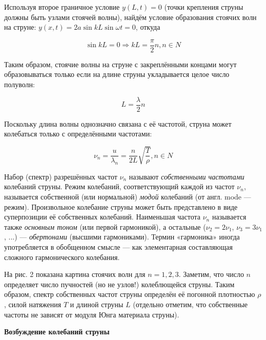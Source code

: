 \documentclass[14pt]{article}
\begin{document}
Используя второе граничное условие $y(L, t) = 0$ (точки крепления струны должны быть узлами стоячей волны), найдём условие образования стоячих
волн на струне: $y(x, t) = 2a\sin kL \sin \omega t = 0$, откуда 

$$\sin kL = 0 \Rightarrow kL = \frac{\pi}{2}n, n \in N$$

Таким образом, стоячие волны на струне с закреплёнными концами могут образовываться только если на длине струны укладывается целое число полуволн:

\begin{center}
\begin{equation}
L = \frac{\lambda}{2}n
\end{equation}
\end{center}

Поскольку длина волны однозначно связана с её частотой, струна может колебаться только с определёнными частотами:

\begin{center}
\begin{equation}
\nu_n = \frac{u}{\lambda_n} = \frac{n}{2L}\sqrt{\frac{T}{\rho}}, n \in N
\end{equation}
\end{center}

Набор (спектр) разрешённых частот $\nu_n$ называют \textsl{собственными частотами} колебаний струны. Режим колебаний, соответствующий каждой из частот $\nu_n$, называется собственной (или нормальной) \textsl{модой} колебаний (от англ. mode --- режим). Произвольное колебание струны может быть представлено в виде суперпозиции её собственных колебаний. Наименьшая частота $\nu_n$ называется также \textsl{основным тоном} (или первой гармоникой), а остальные ($\nu_2 = 2\nu_1$, $\nu_3 = 3\nu_1$, ...) --- \textsl{обертонами} (высшими гармониками). Термин «гармоника» иногда употребляется в обобщенном смысле — как элементарная составляющая сложного гармонического колебания.

На рис. 2 показана картина стоячих волн для $n = 1, 2, 3$. Заметим, что число $n$ определяет число пучностей (но не узлов!) колеблющейся струны. Таким образом, спектр собственных частот струны определён её погонной плотностью $\rho$, силой натяжения $T$ и длиной струны $L$ (отдельно отметим, что собственные частоты не зависят от модуля Юнга материала струны).

%
%

\vspace{1cm}
\textbf{Возбуждение колебаний струны}
\end{document}
